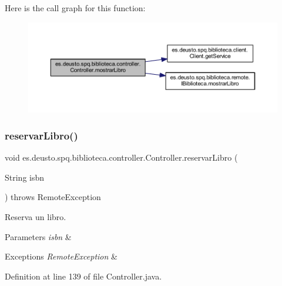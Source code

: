 Here is the call graph for this function\+:
\nopagebreak
\begin{figure}[H]
\begin{center}
\leavevmode
\includegraphics[width=350pt]{classes_1_1deusto_1_1spq_1_1biblioteca_1_1controller_1_1_controller_a180523dc3bcc8baf2ff083b1fec1505c_cgraph}
\end{center}
\end{figure}
\mbox{\label{classes_1_1deusto_1_1spq_1_1biblioteca_1_1controller_1_1_controller_a3c1193157badc8d2dad7125e8e0658f6}} 
\subsubsection{\texorpdfstring{reservar\+Libro()}{reservarLibro()}}
{\footnotesize\ttfamily void es.\+deusto.\+spq.\+biblioteca.\+controller.\+Controller.\+reservar\+Libro (\begin{DoxyParamCaption}\item[{String}]{isbn }\end{DoxyParamCaption}) throws Remote\+Exception}

Reserva un libro. 
\begin{DoxyParams}{Parameters}
{\em isbn} & \\
\hline
\end{DoxyParams}

\begin{DoxyExceptions}{Exceptions}
{\em Remote\+Exception} & \\
\hline
\end{DoxyExceptions}


Definition at line 139 of file Controller.\+java.

